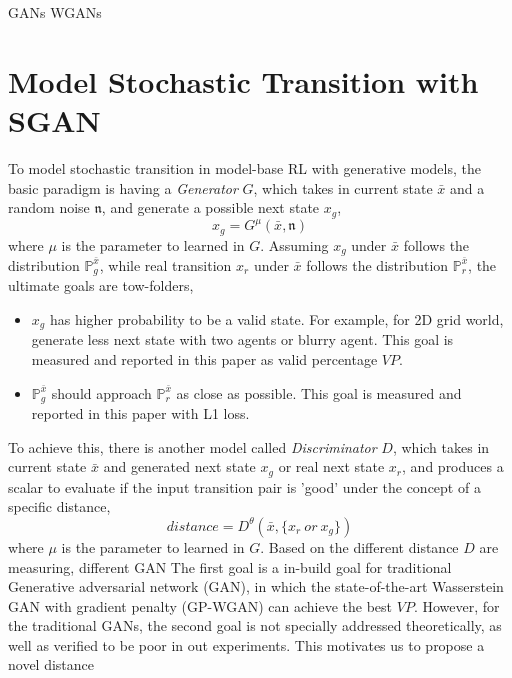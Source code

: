 \documentclass[letterpaper]{article} %
\begin{document}
GANs WGANs

\section{Model Stochastic Transition with SGAN}

To model stochastic transition in model-base RL with generative models, the basic paradigm is having a \textit{Generator} $G$, which takes in current state $\bar{x}$ and a random noise $\mathfrak{n}$, and generate a possible next state $x_g$,
\begin{equation}\label{g-model}
    x_g = G^{\mu}(\bar{x},\mathfrak{n})
\end{equation}
where $\mu$ is the parameter to learned in $G$.
Assuming $x_g$ under $\bar{x}$ follows the distribution $\mathbb{P}^{\bar{x}}_{g}$, while real transition $x_r$ under $\bar{x}$ follows the distribution $\mathbb{P}^{\bar{x}}_{r}$,
the ultimate goals are tow-folders,
\begin{itemize}
    \item $x_g$ has higher probability to be a valid state. For example, for 2D grid world, generate less next state with two agents or blurry agent. This goal is measured and reported in this paper as valid percentage $VP$.
    \item $\mathbb{P}^{\bar{x}}_{g}$ should approach $\mathbb{P}^{\bar{x}}_{r}$ as close as possible. This goal is measured and reported in this paper with L1 loss.
\end{itemize}
To achieve this, there is another model called \textit{Discriminator} $D$, which takes in current state $\bar{x}$ and generated next state $x_g$ or real next state $x_r$, and produces a scalar to evaluate if the input transition pair is 'good' under the concept of a specific distance,
\begin{equation}\label{d-model}
    distance = D^{\theta}(\bar{x},\{x_r~or~x_g\})
\end{equation}
where $\mu$ is the parameter to learned in $G$.
Based on the different distance $D$ are measuring, different GAN
The first goal is a in-build goal for traditional Generative adversarial network (GAN), in which the state-of-the-art Wasserstein GAN with gradient penalty (GP-WGAN) can achieve the best $VP$. However, for the traditional GANs, the second goal is not specially addressed theoretically, as well as verified to be poor in out experiments.
This motivates us to propose a novel distance
\end{document}
